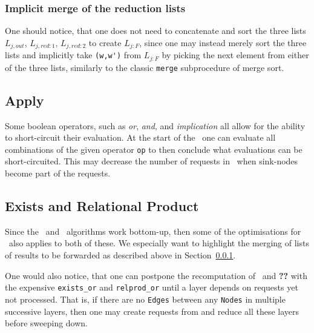 
\subsubsection{Implicit merge of the reduction lists}
\label{sec:optimisations_reduce__merge}

One should notice, that one does not need to concatenate and sort the three
lists $L_{j,\mathit{out}}$, $L_{j,\mathit{red:}1}$, $L_{j,\mathit{red:}2}$ to
create $L_{j:F}$, since one may instead merely sort the three lists and
implicitly take \lstinline{(w,w')} from $L_{j:F}$ by picking the next element
from either of the three lists, similarly to the classic \lstinline{merge}
subprocedure of merge sort.

\subsection{Apply}
Some boolean operators, such as \emph{or}, \emph{and}, and \emph{implication}
all allow for the ability to short-circuit their evaluation. At the start of the
\Apply\ one can evaluate all combinations of the given operator \lstinline{op}
to then conclude what evaluations can be short-circuited. This may decrease the
number of requests in \ApplyQrec\ when sink-nodes become part of the requests.


\subsection{Exists and Relational Product}
Since the \Exists\ and \RelProd\ algorithms work bottom-up, then some of the
optimisations for \Reduce\ also applies to both of these. We especially want to
highlight the merging of lists of results to be forwarded as described above in
Section~\ref{sec:optimisations_reduce__merge}.

One would also notice, that one can postpone the recomputation of \ExistsLres\
and \textbf{??} with the expensive \lstinline{exists_or} and
\lstinline{relprod_or} until a layer depends on requests yet not processed. That
is, if there are no \lstinline{Edges} between any \lstinline{Nodes} in multiple
successive layers, then one may create requests from and reduce all these layers
before sweeping down.


